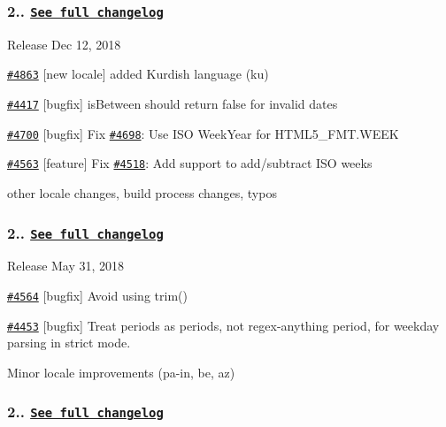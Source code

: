 \subsubsection*{2.. \href{https://gist.github.com/marwahaha/eadb7ac11b761290399a576f8b2419a5}{\tt See full changelog}}


\begin{DoxyItemize}
\item Release Dec 12, 2018
\item \href{https://github.com/moment/moment/pull/4863}{\tt \#4863} \mbox{[}new locale\mbox{]} added Kurdish language (ku)
\item \href{https://github.com/moment/moment/pull/4417}{\tt \#4417} \mbox{[}bugfix\mbox{]} is\+Between should return false for invalid dates
\item \href{https://github.com/moment/moment/pull/4700}{\tt \#4700} \mbox{[}bugfix\mbox{]} Fix \href{https://github.com/moment/moment/pull/4698}{\tt \#4698}\+: Use I\+SO Week\+Year for H\+T\+M\+L5\+\_\+\+F\+M\+T.\+W\+E\+EK
\item \href{https://github.com/moment/moment/pull/4563}{\tt \#4563} \mbox{[}feature\mbox{]} Fix \href{https://github.com/moment/moment/pull/4518}{\tt \#4518}\+: Add support to add/subtract I\+SO weeks
\item other locale changes, build process changes, typos
\end{DoxyItemize}

\subsubsection*{2.. \href{https://gist.github.com/marwahaha/4d992c13c2dbc0f59d4d8acae1dc6d3a}{\tt See full changelog}}


\begin{DoxyItemize}
\item Release May 31, 2018
\item \href{https://github.com/moment/moment/pull/4564}{\tt \#4564} \mbox{[}bugfix\mbox{]} Avoid using trim()
\item \href{https://github.com/moment/moment/pull/4453}{\tt \#4453} \mbox{[}bugfix\mbox{]} Treat periods as periods, not regex-\/anything period, for weekday parsing in strict mode.
\item Minor locale improvements (pa-\/in, be, az)
\end{DoxyItemize}

\subsubsection*{2.. \href{https://gist.github.com/marwahaha/ff2cd13d0eda08afb7a237b10aae558c}{\tt See full changelog}}


